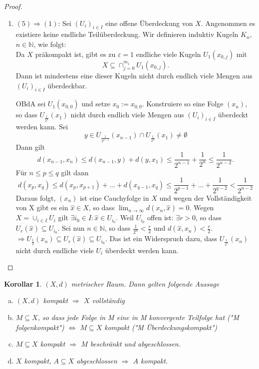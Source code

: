\documentclass[ngerman]{report}
\theoremstyle{plain}%
\newtheorem{cor}[thm]{Korollar}
\theoremstyle{definition}%
\theoremstyle{myStyle}
\newcommand{\N}{\mathbb{N}}
\newcommand{\df}[1][]{%
	\overset{#1}{\Rightarrow}
}
\newcommand{\limes}[1][\infty]{\lim_{n \to #1}}
\newcommand{\qmarks}[1]{"#1"}
\begin{document}
\begin{proof}
\begin{enumerate}[]
		\item $(5) \df (1)$: 
			Sei $(U_i)_{i\in I}$ eine offene Überdeckung von $X$.
			Angenommen es existiere keine endliche Teilüberdeckung. Wir definieren induktiv Kugeln $K_n$, $n\in\N$, wie folgt:\\
			Da $X$ präkompakt ist, gibt es zu $\varepsilon = 1$ endliche viele Kugeln $U_1(x_{0,j})$ mit 
				$$X \subseteq \cap_{j=0}^{m_1} U_1(x_{0,j}).$$
			Dann ist mindestens eine dieser Kugeln nicht durch endlich viele Mengen aus $(U_i)_{i\in I}$ überdeckbar.\par
			OBdA sei $U_1(x_{0,0})$ und setze $x_0 := x_{0,0}$. 
			Konstruiere so eine Folge $(x_n)$, so dass $U_{\frac{1}{2^n}}(x_1)$ nicht durch endlich viele Mengen aus $(U_i)_{i\in I}$ überdeckt werden kann. 
			Sei 
				$$y \in U_{\frac{1}{2^{n-1}}}(x_{n-1}) \cap U_{\frac{1}{2^n}}(x_1) \neq \emptyset$$ 
			Dann gilt 
				$$d(x_{n-1},x_n) \leq d(x_{n-1},y) + d(y,x_1) \leq \frac{1}{2^{n-1}} + \frac{1}{2^n} \leq \frac{1}{2^{n-2}}.$$
			Für $n \leq p \leq q$ gilt dann 
				$$d(x_p,x_q) \leq d(x_p,x_{p+1}) + \dots + d(x_{q-1},x_{q})
				\leq \frac{1}{2^{p-1}} + \dots + \frac{1}{2^{q-2}} < \frac{1}{2^{n-2}}$$
			Daraus folgt, $(x_n)$ ist eine Cauchyfolge in $X$ und wegen der Vollständigkeit von X 
			gibt es ein $\hat{x} \in X$, so dass $\limes d(x_n,\hat{x}) = 0$. 
			Wegen $X = \cup_{i\in I} U_i$ gilt $\exists i_0\in I: \hat{x}\in U_{i_0}$.
			Weil $U_{i_0}$ offen ist: $\exists r>0$, so dass $U_r(\hat{x}) \subseteq U_{i_0}$.
			Sei nun $n\in \N$, so dass $\frac{1}{2^n} < \frac{r}{2}$ und $d(\hat{x}, x_n) < \frac{r}{2}$.
			$\df U_{\frac{1}{2}} (x_n) \subseteq U_r(\hat{x}) \subseteq U_{i_0}$. 
			Das ist ein Widerspruch dazu, dass $U_{\frac{1}{2^n}}(x_n)$ nicht durch endliche viele $U_i$ überdeckt werden kann.
		\end{enumerate}
	\end{proof}

	\begin{cor}
		$(X,d)$ metrischer Raum. Dann gelten folgende Aussage
			\begin{enumerate}[a)]
				\item $(X,d)$ kompakt $\df$ $X$ vollständig
				\item $M\subseteq X$, so dass jede Folge in M eine in M konvergente Teilfolge hat (\qmarks{M folgenkompakt})
					$\Leftrightarrow$ $M \subseteq X$ kompakt (\qmarks{M Überdeckungskompakt})
				\item $M\subseteq X$ kompakt $\df$ $M$ beschränkt und abgeschlossen.
				\item $X$ kompakt, $A \subseteq X$ abgeschlossen $\df$ $A$ kompakt.
			\end{enumerate}
	\end{cor}
\end{document}
